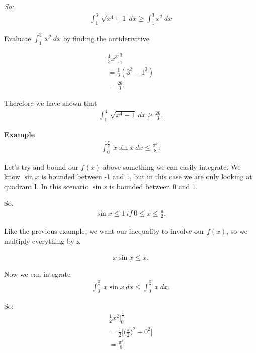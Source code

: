 \documentclass{report}
\begin{document}
\bigbreak \noindent
\textit{So:}
\begin{align*}
  \int_{1}^{3}\ \sqrt{x^{4} + 1}\ dx \geq \int_{1}^{3}x^{2}\ dx
\end{align*}

\bigbreak \noindent \bigbreak \noindent
Evaluate $\int_{1}^{3}\ x^{2}\ dx$ by finding the antiderivitive

\begin{align*}
\frac{1}{3}x^{3}\bigg]_{1}^{3} \\
= \frac{1}{3}(3^{3} -1^{3}) \\
\boxed{= \frac{26}{3}}
.\end{align*}

\bigbreak \noindent \bigbreak \noindent
Therefore we have shown that
\begin{align*}
  \int_{1}^{3}\ \sqrt{x^{4} + 1}\ dx \geq \frac{26}{3} 
.\end{align*}

\bigbreak \noindent 
\begin{mdframed}
  \textbf{Example}
  \begin{align*}
    \int_{0}^{\frac{\pi}{2}}\ x\sin{x}\ dx \leq \frac{\pi^{2}}{8}
  .\end{align*}
\end{mdframed}

\bigbreak \noindent \bigbreak \noindent
Let's try and bound our $f(x)$ above something we can easily integrate. We know $\sin{x}$ is bounded between -1 and 1, but in this case we are only looking at quadrant I. In this scenario $\sin{x}$ is bounded between 0 and 1.

\bigbreak \noindent \bigbreak \noindent
So.
\begin{align*}
  \sin{x} \leq 1\ if\ 0 \leq x \leq \frac{\pi}{2}
.\end{align*}

\bigbreak \noindent \bigbreak \noindent
Like the previous example, we want our inequality to involve our $f(x)$, so we multiply everything by x

\begin{align*}
  x\sin{x} \leq x
.\end{align*}

\pagebreak \bigbreak \noindent
Now we can integrate
\begin{align*}
  \int_{0}^{\frac{\pi}{2}}\ x\sin{x}\ dx \leq \int_{0}^{\frac{\pi}{2}}\ x\ dx
.\end{align*}

\bigbreak \noindent
So:
\begin{align*}
\frac{1}{2}x^{2}\bigg]_{0}^{\frac{\pi}{2}} \\
= \frac{1}{2}\bigg[\bigg(\frac{\pi}{2}\bigg)^{2} - 0^{2}\bigg] \\
\boxed{= \frac{\pi^{2}}{8}}
\end{align*}
\end{document}
